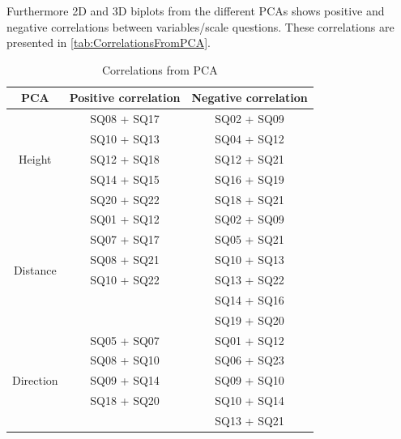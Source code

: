 Furthermore 2D and 3D biplots from the different PCAs shows positive and negative correlations between variables/scale questions. These correlations are presented in \autoref{tab:CorrelationsFromPCA}.
%
\begin{table}
	\centering
	\caption{Correlations from PCA}
	\label{tab:CorrelationsFromPCA} 
	\begin{tabular}{ c|c|c }
		\centering
		PCA & Positive correlation & Negative correlation \\ \hline
		\multirow{5}{*}{Height} & SQ08  + SQ17 & SQ02  + SQ09 \\
		& SQ10 + SQ13 & SQ04 + SQ12 \\
		& SQ12 + SQ18 & SQ12 + SQ21 \\
		& SQ14 + SQ15 & SQ16 + SQ19 \\
		& SQ20 + SQ22 & SQ18 + SQ21\\ \hline
		\multirow{6}{*}{Distance} & SQ01 + SQ12 & SQ02 + SQ09 \\
		& SQ07 + SQ17 & SQ05 + SQ21 \\
		& SQ08 + SQ21 & SQ10 + SQ13 \\
		& SQ10 + SQ22 & SQ13 + SQ22 \\
		&  & SQ14 + SQ16 \\	
		&  & SQ19 + SQ20 \\ \hline	
		\multirow{5}{*}{Direction} 
		& SQ05 + SQ07 & SQ01 + SQ12 \\
		& SQ08 + SQ10 & SQ06 + SQ23 \\
		& SQ09 + SQ14 & SQ09 + SQ10 \\
		& SQ18 + SQ20 & SQ10 + SQ14 \\
		&  & SQ13 + SQ21
	
	\end{tabular}        
\end{table}
\noindent
%

